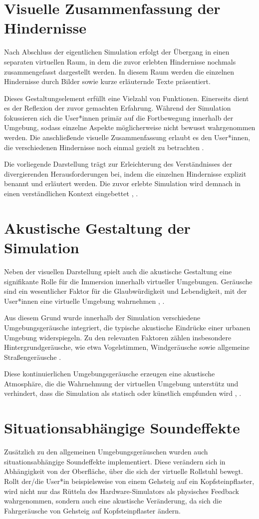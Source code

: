 \section{Visuelle Zusammenfassung der Hindernisse}
Nach Abschluss der eigentlichen Simulation erfolgt der Übergang in einen separaten virtuellen Raum, in dem die zuvor erlebten Hindernisse nochmals zusammengefasst dargestellt werden. In diesem Raum werden die einzelnen Hindernisse durch Bilder sowie kurze erläuternde Texte präsentiert.

Dieses Gestaltungselement erfüllt eine Vielzahl von Funktionen. Einerseits dient es der Reflexion der zuvor gemachten Erfahrung. Während der Simulation fokussieren sich die User*innen primär auf die Fortbewegung innerhalb der Umgebung, sodass einzelne Aspekte möglicherweise nicht bewusst wahrgenommen werden. Die anschließende visuelle Zusammenfassung erlaubt es den User*innen, die verschiedenen Hindernisse noch einmal gezielt zu betrachten \cite{Kolb2015}.

Die vorliegende Darstellung trägt zur Erleichterung des Verständnisses der divergierenden Herausforderungen bei, indem die einzelnen Hindernisse explizit benannt und erläutert werden. Die zuvor erlebte Simulation wird demnach in einen verständlichen Kontext eingebettet \cite{Kolb2015}, \cite{Dede2009}.

\section{Akustische Gestaltung der Simulation}
Neben der visuellen Darstellung spielt auch die akustische Gestaltung eine signifikante Rolle für die Immersion innerhalb virtueller Umgebungen. Geräusche sind ein wesentlicher Faktor für die Glaubwürdigkeit und Lebendigkeit, mit der User*innen eine virtuelle Umgebung wahrnehmen \cite{Begault2000},
\cite{Kleiner2007}.

Aus diesem Grund wurde innerhalb der Simulation verschiedene Umgebungsgeräusche integriert, die typische akustische Eindrücke einer urbanen Umgebung widerspiegeln. Zu den relevanten Faktoren zählen insbesondere Hintergrundgeräusche, wie etwa Vogelstimmen, Windgeräusche sowie allgemeine Straßengeräusche \cite{Frieder}.

Diese kontinuierlichen Umgebungsgeräusche erzeugen eine akustische Atmosphäre, die die Wahrnehmung der virtuellen Umgebung unterstütz und verhindert, dass die Simulation als statisch oder künstlich empfunden wird \cite{Begault2000},
\cite{Kleiner2007}.

\section{Situationsabhängige Soundeffekte}
Zusätzlich zu den allgemeinen Umgebungsgeräuschen wurden auch situationsabhängige Soundeffekte implementiert. Diese verändern sich in Abhängigkeit von der Oberfläche, über die sich der virtuelle Rollstuhl bewegt. Rollt der/die User*in beispielsweise von einem Gehsteig auf ein Kopfsteinpflaster, wird nicht nur das Rütteln des Hardware-Simulators als physisches Feedback wahrgenommen, sondern auch eine akustische Veränderung, da sich die Fahrgeräusche von Gehsteig auf Kopfsteinpflaster ändern.
